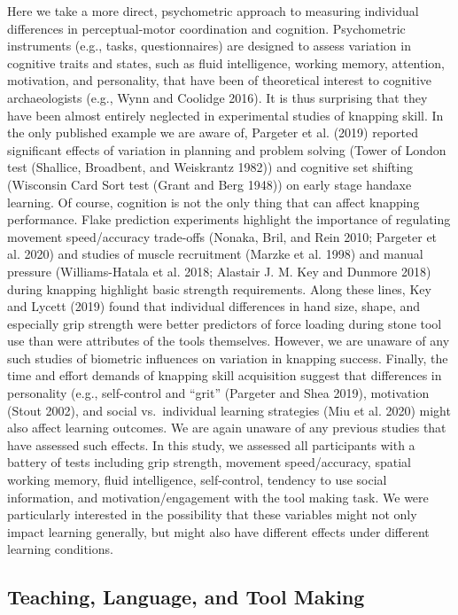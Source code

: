 \documentclass[smallextended]{svjour3}       %
\begin{document}
Here we take a more direct, psychometric approach to measuring
individual differences in perceptual-motor coordination and cognition.
Psychometric instruments (e.g., tasks, questionnaires) are designed to
assess variation in cognitive traits and states, such as fluid
intelligence, working memory, attention, motivation, and personality,
that have been of theoretical interest to cognitive archaeologists
(e.g., Wynn and Coolidge 2016). It is thus surprising that they have
been almost entirely neglected in experimental studies of knapping
skill. In the only published example we are aware of, Pargeter et al.
(2019) reported significant effects of variation in planning and problem
solving (Tower of London test (Shallice, Broadbent, and Weiskrantz
1982)) and cognitive set shifting (Wisconsin Card Sort test (Grant and
Berg 1948)) on early stage handaxe learning. Of course, cognition is not
the only thing that can affect knapping performance. Flake prediction
experiments highlight the importance of regulating movement
speed/accuracy trade-offs (Nonaka, Bril, and Rein 2010; Pargeter et al.
2020) and studies of muscle recruitment (Marzke et al. 1998) and manual
pressure (Williams-Hatala et al. 2018; Alastair J. M. Key and Dunmore
2018) during knapping highlight basic strength requirements. Along these
lines, Key and Lycett (2019) found that individual differences in hand
size, shape, and especially grip strength were better predictors of
force loading during stone tool use than were attributes of the tools
themselves. However, we are unaware of any such studies of biometric
influences on variation in knapping success. Finally, the time and
effort demands of knapping skill acquisition suggest that differences in
personality (e.g., self-control and ``grit'' (Pargeter and Shea 2019),
motivation (Stout 2002), and social vs.~individual learning strategies
(Miu et al. 2020) might also affect learning outcomes. We are again
unaware of any previous studies that have assessed such effects. In this
study, we assessed all participants with a battery of tests including
grip strength, movement speed/accuracy, spatial working memory, fluid
intelligence, self-control, tendency to use social information, and
motivation/engagement with the tool making task. We were particularly
interested in the possibility that these variables might not only impact
learning generally, but might also have different effects under
different learning conditions.~

\hypertarget{teaching-language-and-tool-making}{%
\subsection{\texorpdfstring{\textbf{Teaching, Language, and Tool
Making}}{Teaching, Language, and Tool Making}}\label{teaching-language-and-tool-making}}
\end{document}

